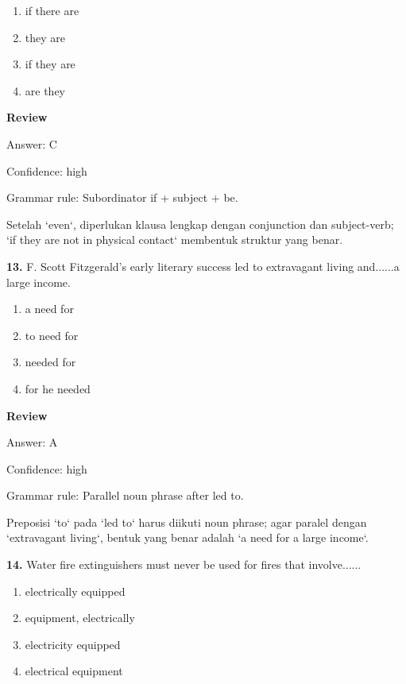 \documentclass[12pt]{article}
\begin{document}
\begin{enumerate}[label=(\Alph*),leftmargin=*,itemsep=0.2em]
\item if there are
\item they are
\item if they are
\item are they
\end{enumerate}
\par
\begingroup
\setlength{\parskip}{0pt}
\setlength{\parindent}{0pt}
\textbf{Review}\par
Answer: C\par
Confidence: high\par
Grammar rule: Subordinator if + subject + be.\par
Setelah `even`, diperlukan klausa lengkap dengan conjunction dan subject-verb; `if they are not in physical contact` membentuk struktur yang benar.\par
\endgroup
\par
\vspace{0.25\baselineskip}
\noindent\textbf{13.} F. Scott Fitzgerald's early literary success led to extravagant living and......a large income.
\begin{enumerate}[label=(\Alph*),leftmargin=*,itemsep=0.2em]
\item a need for
\item to need for
\item needed for
\item for he needed
\end{enumerate}
\par
\begingroup
\setlength{\parskip}{0pt}
\setlength{\parindent}{0pt}
\textbf{Review}\par
Answer: A\par
Confidence: high\par
Grammar rule: Parallel noun phrase after led to.\par
Preposisi `to` pada `led to` harus diikuti noun phrase; agar paralel dengan `extravagant living`, bentuk yang benar adalah `a need for a large income`.\par
\endgroup
\par
\vspace{0.25\baselineskip}
\noindent\textbf{14.} Water fire extinguishers must never be used for fires that involve......
\begin{enumerate}[label=(\Alph*),leftmargin=*,itemsep=0.2em]
\item electrically equipped
\item equipment, electrically
\item electricity equipped
\item electrical equipment
\end{enumerate}
\end{document}

